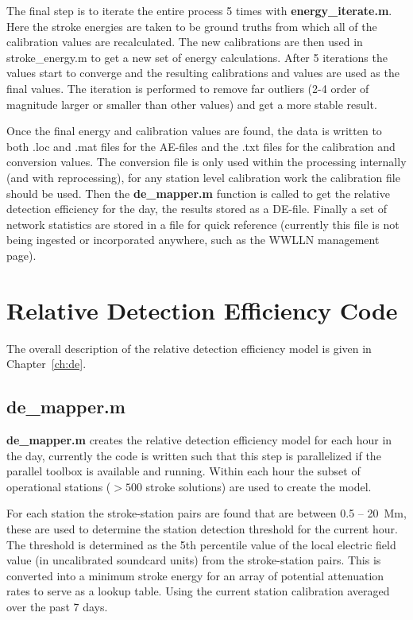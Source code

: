 The final step is to iterate the entire process 5 times with {\bf energy\_iterate.m}.
Here the stroke energies are taken to be ground truths from which all of the calibration values are recalculated.
The new calibrations are then used in stroke\_energy.m to get a new set of energy calculations.
After 5 iterations the values start to converge and the resulting calibrations and values are used as the final values.
The iteration is performed to remove far outliers (2-4 order of magnitude larger or smaller than other values) and get a more stable result.

Once the final energy and calibration values are found, the data is written to both .loc and .mat files for the AE-files and the .txt files for the calibration and conversion values.
The conversion file is only used within the processing internally (and with reprocessing), for any station level calibration work the calibration file should be used.
Then the {\bf de\_mapper.m} function is called to get the relative detection efficiency for the day, the results stored as a DE-file.
Finally a set of network statistics are stored in a file for quick reference (currently this file is not being ingested or incorporated anywhere, such as the WWLLN management page).

\section{Relative Detection Efficiency Code}

The overall description of the relative detection efficiency model is given in Chapter~\ref{ch:de}.

\subsection{de\_mapper.m}

{\bf de\_mapper.m} creates the relative detection efficiency model for each hour in the day, currently the code is written such that this step is parallelized if the parallel toolbox is available and running.
Within each hour the subset of operational stations ($>500$ stroke solutions) are used to create the model.

For each station the stroke-station pairs are found that are between 0.5 -- 20~Mm, these are used to determine the station detection threshold for the current hour.
The threshold is determined as the 5th percentile value of the local electric field value (in uncalibrated soundcard units) from the stroke-station pairs.
This is converted into a minimum stroke energy for an array of potential attenuation rates to serve as a lookup table.
Using the current station calibration averaged over the past 7 days.

